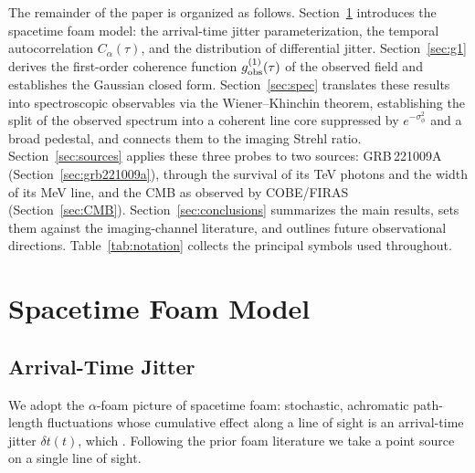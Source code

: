 \documentclass[aps,prd,onecolumn,amsmath,amssymb]{revtex4-2}
\begin{document}
The remainder of the paper is organized as follows.
Section~\ref{sec:model} introduces the spacetime foam model: the
arrival-time jitter parameterization, the temporal autocorrelation
$C_\alpha(\tau)$, and the distribution of differential jitter.
Section~\ref{sec:g1} derives the first-order coherence function
$g^{(1)}_{\rm obs}(\tau)$ of the observed field and establishes the
Gaussian closed form.
Section~\ref{sec:spec} translates these results into spectroscopic observables
via the Wiener--Khinchin theorem, establishing the split of the observed
spectrum into a coherent line core suppressed by $e^{-\sigma_\phi^2}$ and a
broad pedestal, and connects them to the imaging Strehl ratio.
Section~\ref{sec:sources} applies these three probes to two
sources: GRB\,221009A (Section~\ref{sec:grb221009a}), through the survival of
its TeV photons and the width of its MeV line, and the CMB as observed by
COBE/FIRAS (Section~\ref{sec:CMB}).
Section~\ref{sec:conclusions} summarizes the main results, sets them
against the imaging-channel literature, and outlines future
observational directions.
Table~\ref{tab:notation} collects the principal symbols used throughout.

\section{Spacetime Foam Model}
\label{sec:model}

\subsection{Arrival-Time Jitter}
\label{sec:metric_origin}

We adopt the $\alpha$-foam picture of spacetime foam: stochastic,
achromatic path-length fluctuations whose cumulative effect along a line
of sight is an arrival-time jitter $\delta t(t)$, which
.
Following the prior foam literature we take a point source on a single
line of sight.
\end{document}

